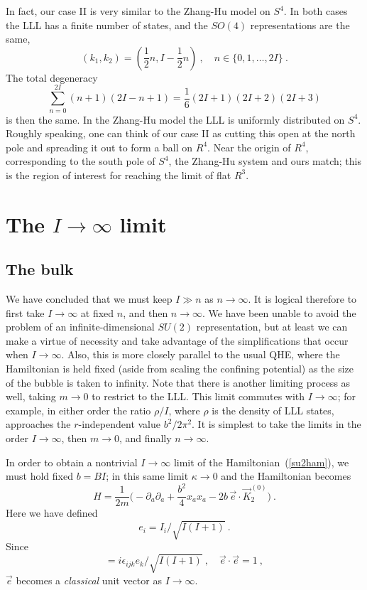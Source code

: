 \documentclass[a4paper,12pt]{article}
\newcommand{\R}{R}
\newcommand{\sect}[1]{\section{#1}\setcounter{equation}{0}}
\newcommand{\half}{{\textstyle \frac{1}{2}}}
\begin{document}
In fact, our case II is very
similar to the Zhang-Hu model on $S^4$.  In both cases the LLL has a finite
number of states, and the $SO(4)$ representations are the same,
\begin{equation}
(k_1,k_2) = (\half n, I - \half n)\ ,\quad n\in \{ 0,1,\ldots,2I\}\ .
\end{equation}
The total degeneracy 
\begin{equation}
\sum_{n=0}^{2I} (n+1)(2I - n + 1) = \frac{1}{6}(2I+1)(2I+2)(2I+3)
\end{equation}
is then the same.  In the Zhang-Hu model the LLL is uniformly distributed
on $S^4$.  Roughly speaking, one can think of our case II as cutting this
open at the north pole and spreading it out to form a ball on $\R^4$.  Near
the origin of $\R^4$, corresponding to the south pole of $S^4$, the Zhang-Hu
system and ours match; this is the region of interest for reaching the
limit of flat $\R^3$.

\sect{The $I \to \infty$ limit}

\subsection{The bulk}

We have concluded that we must keep $I\gg n$ as $n \to \infty$.  
It is logical therefore to first take $I \to \infty$ at fixed $n$, and then $n
\to
\infty$.  We have been unable to avoid the problem of an infinite-dimensional
$SU(2)$ representation, but at least we can make a virtue of necessity and take
advantage of the simplifications that occur when $I \to \infty$.  Also, this
is more closely parallel to the usual QHE, where the Hamiltonian is held fixed
(aside from scaling the confining potential) as the size of the bubble is
taken to infinity.  Note that there is another limiting process as well,
taking $m \to 0$ to restrict to the LLL.  This limit commutes with $I \to
\infty$; for example, in either order the ratio $\rho/I$, where $\rho$ is the
density of LLL states, approaches the
$r$-independent value $b^2/2\pi^2$.  It is simplest
to take the limits in the order
$I\to\infty$, then $m \to 0$, and finally $n \to \infty$.

In order to obtain a nontrivial $I \to \infty$ limit of the
Hamiltonian~(\ref{su2ham}), we must hold fixed $b = BI$; in this same limit
$\kappa \to 0$ and the Hamiltonian becomes
\begin{equation}
H = \frac{1}{2m} \biggl(-\partial_a \partial_a + \frac{b^2}{4} x_a x_a
- 2b\, \vec e \cdot \vec K_{2}^{(0)} \biggr)\ .
\label{limham}
\end{equation}
Here we have defined
\begin{equation}
e_i = {I_i}\Big/{\sqrt{I(I+1)}}\ .
\end{equation}
Since
\begin{equation}
[ e_i,  e_j] =  {i} \epsilon_{ijk}  e_k\Big/{\sqrt{I(I+1)}}\
,\quad \vec e
\cdot \vec e = 1\ ,
\end{equation}
$\vec e$ becomes a {\it classical} unit vector as $I \to \infty$.  
\end{document}
